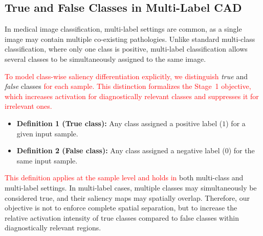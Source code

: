 \documentclass[preprint,7pt, a4paper]{elsarticle}
\begin{document}
\subsection{True and False Classes in Multi-Label CAD}

In medical image classification, multi-label settings are common, as a single image may contain multiple co-existing pathologies. Unlike standard multi-class classification, where only one class is positive, multi-label classification allows several classes to be simultaneously assigned to the same image.

\textcolor{red}{To model class-wise saliency differentiation explicitly, we distinguish} \emph{true} and \emph{false} classes \textcolor{red}{for each sample. This distinction formalizes the Stage~1 objective, which increases activation for diagnostically relevant classes and suppresses it for irrelevant ones.}

\begin{itemize}
\item \textbf{Definition 1 (True class):} Any class assigned a positive label ($1$) for a given input sample.
\item \textbf{Definition 2 (False class):} Any class assigned a negative label ($0$) for the same input sample.
\end{itemize}

\textcolor{red}{This definition applies at the sample level and holds in} both multi-class and multi-label settings. In multi-label cases, multiple classes may simultaneously be considered true, and their saliency maps may spatially overlap. Therefore, our objective is not to enforce complete spatial separation, but to increase the relative activation intensity of true classes compared to false classes within diagnostically relevant regions.
\end{document}
